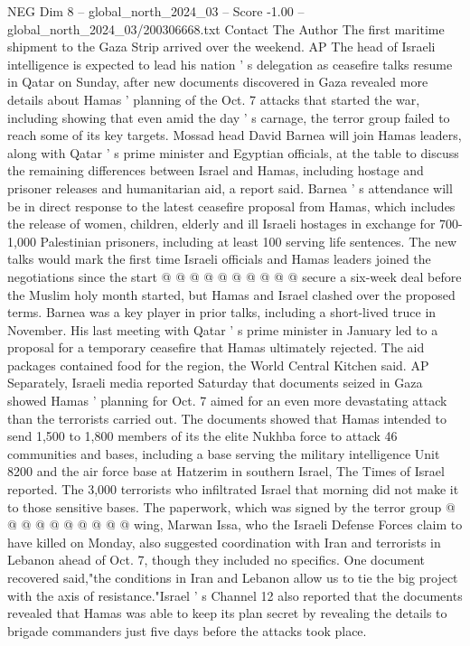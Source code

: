 \begin{textsample}{NEG Dim 8 – global\_north\_2024\_03 – Score -1.00 – global\_north\_2024\_03/200306668.txt}  \label{ex:f8_neg_225}
Contact The Author The first maritime shipment to the Gaza Strip arrived over the weekend.
AP The head of Israeli intelligence is expected to lead his nation ' s delegation as ceasefire talks resume in Qatar on Sunday, after new documents discovered in Gaza revealed more details about Hamas ' planning of the Oct. 7 attacks that started the war, including showing that even amid the day ' s carnage, the terror group failed to reach some of its key targets.
Mossad head David Barnea will join Hamas leaders, along with Qatar ' s prime minister and Egyptian officials, at the table to discuss the remaining differences between Israel and Hamas, including hostage and prisoner releases and humanitarian aid, a report said.
Barnea ' s attendance will be in direct response to the latest ceasefire proposal from Hamas, which includes the release of women, children, elderly and ill Israeli hostages in exchange for 700-1,000 Palestinian prisoners, including at least 100 serving life sentences.
The new talks would mark the first time Israeli officials and Hamas leaders joined the negotiations since the start @ @ @ @ @ @ @ @ @ @ secure a six-week deal before the Muslim holy month started, but Hamas and Israel clashed over the proposed terms.
Barnea was a key player in prior talks, including a short-lived truce in November.
His last meeting with Qatar ' s prime minister in January led to a proposal for a temporary ceasefire that Hamas ultimately rejected.
The aid packages contained food for the region, the World Central Kitchen said.
AP Separately, Israeli media reported Saturday that documents seized in Gaza showed Hamas ' planning for Oct. 7 aimed for an even more devastating attack than the terrorists carried out.
The documents showed that Hamas intended to send 1,500 to 1,800 members of its the elite Nukhba force to attack 46 communities and bases, including a base serving the military intelligence Unit 8200 and the air force base at Hatzerim in southern Israel, The Times of Israel reported.
The 3,000 terrorists who infiltrated Israel that morning did not make it to those sensitive bases.
The paperwork, which was signed by the terror group @ @ @ @ @ @ @ @ @ @ wing, Marwan Issa, who the Israeli Defense Forces claim to have killed on Monday, also suggested coordination with Iran and terrorists in Lebanon ahead of Oct. 7, though they included no specifics.
One document recovered said,"the conditions in Iran and Lebanon allow us to tie the big project with the axis of resistance."Israel ' s Channel 12 also reported that the documents revealed that Hamas was able to keep its plan secret by revealing the details to brigade commanders just five days before the attacks took place.

\end{textsample}
